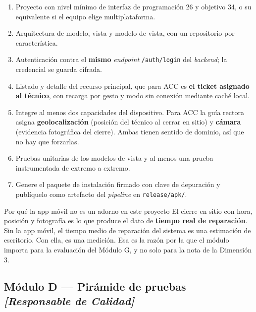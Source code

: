 \documentclass[11pt,a4paper]{article}
\begin{document}
\begin{enumerate}[leftmargin=*,itemsep=3pt]
	\item Proyecto con nivel mínimo de interfaz de programación 26 y objetivo 34, o su equivalente si el equipo elige multiplataforma.
	\item Arquitectura de modelo, vista y modelo de vista, con un repositorio por característica.
	\item Autenticación contra el \textbf{mismo} \emph{endpoint} \texttt{/auth/login} del \emph{backend}; la credencial se guarda cifrada.
	\item Listado y detalle del recurso principal, que para ACC es \textbf{el ticket asignado al técnico}, con recarga por gesto y modo sin conexión mediante caché local.
	\item Integre al menos dos capacidades del dispositivo. Para ACC la guía rectora asigna \textbf{geolocalización} (posición del técnico al cerrar en sitio) y \textbf{cámara} (evidencia fotográfica del cierre). Ambas tienen sentido de dominio, así que no hay que forzarlas.
	\item Pruebas unitarias de los modelos de vista y al menos una prueba instrumentada de extremo a extremo.
	\item Genere el paquete de instalación firmado con clave de depuración y publíquelo como artefacto del \emph{pipeline} en \texttt{release/apk/}.
\end{enumerate}

\begin{defBox}{Por qué la app móvil no es un adorno en este proyecto}
	El cierre en sitio con hora, posición y fotografía es lo que produce el dato de \textbf{tiempo real de reparación}. Sin la app móvil, el tiempo medio de reparación del sistema es una estimación de escritorio. Con ella, es una medición. Esa es la razón por la que el módulo importa para la evaluación del Módulo G, y no solo para la nota de la Dimensión 3.
\end{defBox}

\subsection{Módulo D --- Pirámide de pruebas \emph{[Responsable de Calidad]}}
\end{document}
